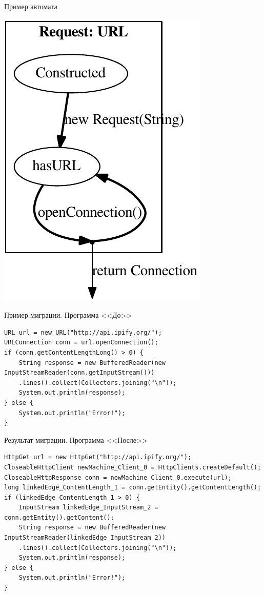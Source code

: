 \documentclass[12pt]{beamer}
\begin{document}
\begin{frame}{Пример автомата}
	\begin{center}
		\includegraphics[height=0.9\textheight]{javaSmall-cropped.pdf}
	\end{center}
\end{frame}

\begin{frame}[fragile]{Пример миграции. Программа <<До>>}

\begin{verbatim}
URL url = new URL("http://api.ipify.org/");
URLConnection conn = url.openConnection();
if (conn.getContentLengthLong() > 0) {
    String response = new BufferedReader(new InputStreamReader(conn.getInputStream()))
    .lines().collect(Collectors.joining("\n"));
    System.out.println(response);
} else {
    System.out.println("Error!");
}
\end{verbatim}
\end{frame}

\begin{frame}[fragile]{Результат миграции. Программа <<После>>}
\begin{verbatim}
HttpGet url = new HttpGet("http://api.ipify.org/");
CloseableHttpClient newMachine_Client_0 = HttpClients.createDefault();
CloseableHttpResponse conn = newMachine_Client_0.execute(url);
long linkedEdge_ContentLength_1 = conn.getEntity().getContentLength();
if (linkedEdge_ContentLength_1 > 0) {
    InputStream linkedEdge_InputStream_2 = conn.getEntity().getContent();
    String response = new BufferedReader(new InputStreamReader(linkedEdge_InputStream_2))
    .lines().collect(Collectors.joining("\n"));
    System.out.println(response);
} else {
    System.out.println("Error!");
}
\end{verbatim}
\end{frame}
\end{document}
